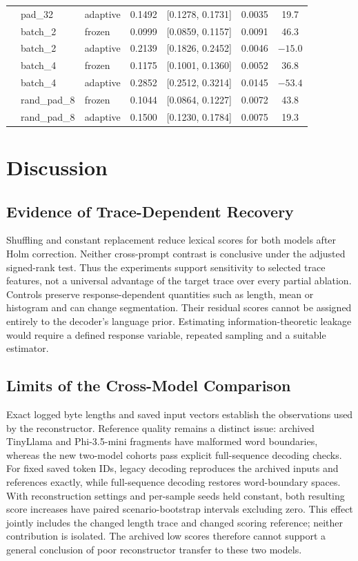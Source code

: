 \documentclass[electronics,article,submit,pdftex,moreauthors]{Definitions/mdpi}
\begin{document}
\begin{table}[ht]
{\begin{tabular}{l l l c c c c}
 & pad\_32 & adaptive & 0.1492 & [0.1278, 0.1731] & 0.0035 & 19.7 \\
 & batch\_2 & frozen & 0.0999 & [0.0859, 0.1157] & 0.0091 & 46.3 \\
 & batch\_2 & adaptive & 0.2139 & [0.1826, 0.2452] & 0.0046 & $-15.0$ \\
 & batch\_4 & frozen & 0.1175 & [0.1001, 0.1360] & 0.0052 & 36.8 \\
 & batch\_4 & adaptive & 0.2852 & [0.2512, 0.3214] & 0.0145 & $-53.4$ \\
 & rand\_pad\_8 & frozen & 0.1044 & [0.0864, 0.1227] & 0.0072 & 43.8 \\
 & rand\_pad\_8 & adaptive & 0.1500 & [0.1230, 0.1784] & 0.0075 & 19.3 \\
\bottomrule
\end{tabular}%
}
\end{table}

\section{Discussion}
\subsection{Evidence of Trace-Dependent Recovery}
Shuffling and constant replacement reduce lexical scores for both models after Holm correction. Neither cross-prompt contrast is conclusive under the adjusted signed-rank test. Thus the experiments support sensitivity to selected trace features, not a universal advantage of the target trace over every partial ablation. Controls preserve response-dependent quantities such as length, mean or histogram and can change segmentation. Their residual scores cannot be assigned entirely to the decoder's language prior. Estimating information-theoretic leakage would require a defined response variable, repeated sampling and a suitable estimator.

\subsection{Limits of the Cross-Model Comparison}
Exact logged byte lengths and saved input vectors establish the observations used by the reconstructor. Reference quality remains a distinct issue: archived TinyLlama and Phi-3.5-mini fragments have malformed word boundaries, whereas the new two-model cohorts pass explicit full-sequence decoding checks. For fixed saved token IDs, legacy decoding reproduces the archived inputs and references exactly, while full-sequence decoding restores word-boundary spaces. With reconstruction settings and per-sample seeds held constant, both resulting score increases have paired scenario-bootstrap intervals excluding zero. This effect jointly includes the changed length trace and changed scoring reference; neither contribution is isolated. The archived low scores therefore cannot support a general conclusion of poor reconstructor transfer to these two models.
\end{document}
